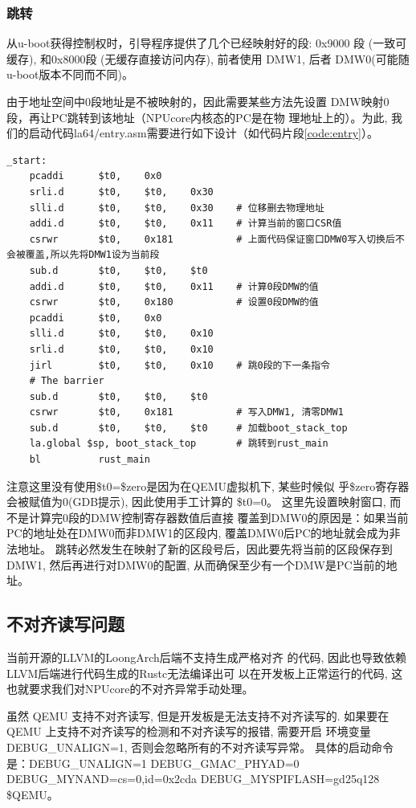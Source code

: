 \subsubsection{跳转}
从u-boot获得控制权时，引导程序提供了几个已经映射好的段: 0x9000
段 (一致可缓存), 和0x8000段 (无缓存直接访问内存), 前者使用 DMW1,
后者 DMW0(可能随u-boot版本不同而不同)。

由于地址空间中0段地址是不被映射的，因此需要某些方法先设置
DMW映射0段，再让PC跳转到该地址（NPUcore内核态的PC是在物
理地址上的）。为此, 我们的启动代码la64/entry.asm需要进行如下设计（如代码片段\autoref{code:entry}）。

\begin{lstlisting}[language={riscv}, label={code:entry},
	caption={la64/entry.asm}]
_start:
    pcaddi      $t0,    0x0
    srli.d      $t0,    $t0,    0x30
    slli.d      $t0,    $t0,    0x30    # 位移删去物理地址
    addi.d      $t0,    $t0,    0x11    # 计算当前的窗口CSR值
    csrwr       $t0,    0x181           # 上面代码保证窗口DMW0写入切换后不会被覆盖,所以先将DMW1设为当前段
    sub.d       $t0,    $t0,    $t0
    addi.d      $t0,    $t0,    0x11    # 计算0段DMW的值
    csrwr       $t0,    0x180           # 设置0段DMW的值
    pcaddi      $t0,    0x0
    slli.d      $t0,    $t0,    0x10
    srli.d      $t0,    $t0,    0x10
    jirl        $t0,    $t0,    0x10    # 跳0段的下一条指令
    # The barrier
    sub.d       $t0,    $t0,    $t0
    csrwr       $t0,    0x181           # 写入DMW1, 清零DMW1
    sub.d       $t0,    $t0,    $t0     # 加载boot_stack_top
    la.global $sp, boot_stack_top       # 跳转到rust_main
    bl          rust_main
\end{lstlisting}
注意这里没有使用\$t0=\$zero是因为在QEMU虚拟机下, 某些时候似
乎\$zero寄存器会被赋值为0(GDB提示), 因此使用手工计算的 \$t0=0。
这里先设置映射窗口, 而不是计算完0段的DMW控制寄存器数值后直接
覆盖到DMW0的原因是：如果当前PC的地址处在DMW0而非DMW1的区段内, 覆盖DMW0后PC的地址就会成为非法地址。
跳转必然发生在映射了新的区段号后，因此要先将当前的区段保存到DMW1, 然后再进行对DMW0的配置,
从而确保至少有一个DMW是PC当前的地址。

\subsection{不对齐读写问题}
当前开源的LLVM的LoongArch后端不支持生成严格对齐
的代码, 因此也导致依赖LLVM后端进行代码生成的Rustc无法编译出可
以在开发板上正常运行的代码, 这也就要求我们对NPUcore的不对齐异常手动处理。

虽然 QEMU 支持不对齐读写, 但是开发板是无法支持不对齐读写的.
如果要在 QEMU 上支持不对齐读写的检测和不对齐读写的报错, 需要开启
环境变量 DEBUG_UNALIGN=1, 否则会忽略所有的不对齐读写异常。
具体的启动命令是：DEBUG_UNALIGN=1 DEBUG_GMAC_PHYAD=0 DEBUG_MYNAND=cs=0,id=0x2cda DEBUG_MYSPIFLASH=gd25q128 \$QEMU。

